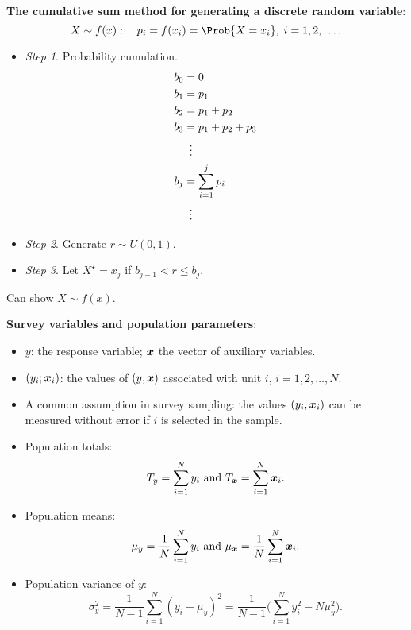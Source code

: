 \textbf{The cumulative sum method for generating a discrete random
      variable}:
\[ X \sim f(x):\quad p_i=f(x_i)=\Prob{X=x_i},\; i=1,2,\ldots. \]
\begin{itemize}
      \item \emph{Step 1}. Probability cumulation.
            \begin{align*}
                  b_0 & =0                 \\
                  b_1 & =p_1               \\
                  b_2 & =p_1+p_2           \\
                  b_3 & =p_1+p_2+p_3       \\
                      & \vdotswithin{=}    \\
                  b_j & =\sum_{i=1}^{j}p_i \\
                      & \vdotswithin{=}
            \end{align*}
      \item \emph{Step 2}. Generate $ r\sim U(0,1) $.
      \item \emph{Step 3}. Let $ X^\star=x_j $ if $ b_{j-1}<r\le b_j $.
\end{itemize}
Can show $ X \sim f(x) $.

\textbf{Survey variables and population parameters}:
\begin{itemize}
      \item $ y $: the response variable; $ \bm{x} $
            the vector of auxiliary variables.
      \item $ (y_i;\bm{x}_i) $: the values of $ (y,\bm{x}) $
            associated with unit $ i $, $ i=1,2,\ldots,N $.
      \item A common assumption in survey sampling: the values $ (y_i,\bm{x}_i) $
            can be measured without error if $ i $ is selected in the sample.
      \item Population totals:
            \[ T_y=\sum_{i=1}^{N}y_i\text{ and }T_{\bm{x}}=\sum_{i=1}^{N}\bm{x}_i. \]
      \item Population means:
            \[ \mu_y=\frac{1}{N}\sum_{i=1}^{N}y_i\text{ and }\mu_{\bm{x}}=\frac{1}{N}\sum_{i=1}^{N}\bm{x}_i. \]
      \item Population variance of $ y $:
            \[ \sigma_y^2=\frac{1}{N-1}\sum_{i=1}^{N}(y_i-\mu_y)^2=\frac{1}{N-1}\biggl(\sum_{i=1}^{N}y_i^2-N\mu_y^2\biggr). \]
\end{itemize}


